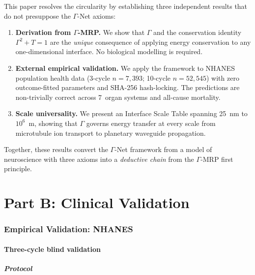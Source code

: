 \documentclass[aps,pre,twocolumn,superscriptaddress,floatfix]{revtex4-2}
\begin{document}
This paper resolves the circularity by establishing
three independent results that do not presuppose
the $\Gamma$-Net axioms:

\begin{enumerate}
  \item \textbf{Derivation from $\Gamma$-MRP.}
    We show that $\Gamma$ and the conservation identity
    $\Gamma^2 + T = 1$ are the \emph{unique} consequence
    of applying energy conservation to any one-dimensional
    interface.  No biological modelling is required.

  \item \textbf{External empirical validation.}
    We apply the framework to NHANES population health data
    (3-cycle $n = 7{,}393$; 10-cycle $n = 52{,}545$)
    with zero outcome-fitted parameters and SHA-256 hash-locking.
    The predictions are non-trivially correct across
    7~organ systems and all-cause mortality.

  \item \textbf{Scale universality.}
    We present an Interface Scale Table spanning 25~nm
    to $10^6$~m, showing that $\Gamma$ governs energy
    transfer at every scale from microtubule ion transport
    to planetary waveguide propagation.
\end{enumerate}

Together, these results convert the $\Gamma$-Net framework
from a model of neuroscience with three axioms into a
\emph{deductive chain} from the $\Gamma$-MRP first principle.






\part*{Part B: Clinical Validation}

\section{Empirical Validation: NHANES}
\label{sec:nhanes}

\subsection{Three-cycle blind validation}
\label{sec:nhanes-3cycle}

\subsubsection{Protocol}
\end{document}
